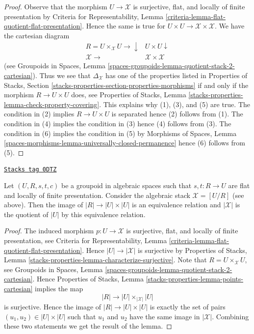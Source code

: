 \begin{proof}
Observe that the morphism $U \to \mathcal{X}$ is surjective, flat, and
locally of finite presentation by
Criteria for Representability, Lemma
\ref{criteria-lemma-flat-quotient-flat-presentation}.
Hence the same is true for $U \times U \to \mathcal{X} \times \mathcal{X}$.
We have the cartesian diagram
$$
\begin{array}{cc}R  = U \times_\mathcal{X} U \longrightarrow\downarrow & U \times U \downarrow \\ \mathcal{X} \longrightarrow & \mathcal{X} \times \mathcal{X}\end{array}
$$
(see Groupoids in Spaces, Lemma
\ref{spaces-groupoids-lemma-quotient-stack-2-cartesian}).
Thus we see that $\Delta_\mathcal{X}$ has one of the properties listed in
Properties of Stacks, Section
\ref{stacks-properties-section-properties-morphisms}
if and only if the morphism $R \to U \times U$ does, see
Properties of Stacks, Lemma
\ref{stacks-properties-lemma-check-property-covering}.
This explains why (1), (3), and (5) are true.
The condition in (2) implies $R \to U \times U$ is separated
hence (2) follows from (1).
The condition in (4) implies the condition in (3)
hence (4) follows from (3).
The condition in (6) implies the condition in (5)
by Morphisms of Spaces, Lemma
\ref{spaces-morphisms-lemma-universally-closed-permanence}
hence (6) follows from (5).
\end{proof}

\begin{lemma}
\label{stacks-morphisms-lemma-points-presentation}
\href{https://stacks.math.columbia.edu/tag/0DTZ}{\texttt{Stacks tag 0DTZ}}

Let $(U, R, s, t, c)$ be a groupoid in algebraic spaces such that
$s, t : R \to U$ are flat and locally of finite presentation.
Consider the algebraic stack $\mathcal{X} = [U/R]$ (see above).
Then the image of $|R| \to |U| \times |U|$ is an equivalence relation
and $|\mathcal{X}|$ is the quotient of $|U|$ by this equivalence relation.
\end{lemma}

\begin{proof}
The induced morphism $p : U \to \mathcal{X}$ is surjective, flat,
and locally of finite presentation, see
Criteria for Representability, Lemma
\ref{criteria-lemma-flat-quotient-flat-presentation}.
Hence $|U| \to |\mathcal{X}|$ is surjective by
Properties of Stacks, Lemma
\ref{stacks-properties-lemma-characterize-surjective}.
Note that $R = U \times_\mathcal{X} U$, see
Groupoids in Spaces,
Lemma \ref{spaces-groupoids-lemma-quotient-stack-2-cartesian}.
Hence
Properties of Stacks, Lemma \ref{stacks-properties-lemma-points-cartesian}
implies the map
$$
|R| \longrightarrow |U| \times_{|\mathcal{X}|} |U|
$$
is surjective. Hence the image of $|R| \to |U| \times |U|$ is
exactly the set of pairs $(u_1, u_2) \in |U| \times |U|$
such that $u_1$ and $u_2$ have the same image in $|\mathcal{X}|$.
Combining these two statements we get the result of the lemma.
\end{proof}

